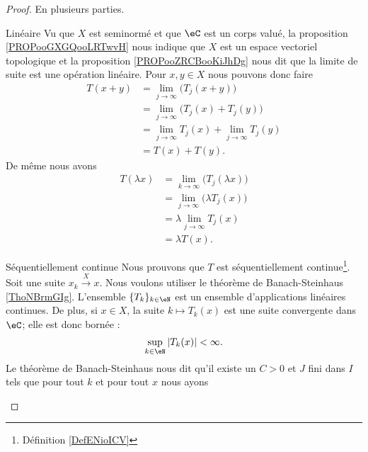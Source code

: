\begin{proof}
    En plusieurs parties.
    \begin{subproof}
    \item[Linéaire]
        Vu que \( X\) est seminormé et que \( \eC\) est un corps valué, la proposition \ref{PROPooGXGQooLRTwvH} nous indique que \( X\) est un espace vectoriel topologique et la proposition \ref{PROPooZRCBooKiJhDg} nous dit que la limite de suite est une opération linéaire. Pour \( x,y\in X\) nous pouvons donc faire
        \begin{subequations}
            \begin{align}
                T(x+y)&=\lim_{j\to \infty} \big( T_j(x+y) \big)\\
                &=\lim_{j\to \infty} \big( T_j(x)+T_j(y) \big)\\
                &=\lim_{j\to \infty} T_j(x)+\lim_{j\to \infty} T_j(y)\\
                &=T(x)+T(y).
            \end{align}
        \end{subequations}
        De même nous avons
        \begin{subequations}
            \begin{align}
                T(\lambda x)&=\lim_{k\to \infty} \big( T_j(\lambda x) \big)\\
                &=\lim_{j\to \infty} \big( \lambda T_j(x) \big)\\
                &=\lambda\lim_{j\to \infty} T_j(x)\\
                &=\lambda T(x).
            \end{align}
        \end{subequations}
    \item[Séquentiellement continue]
        Nous prouvons que \( T\) est séquentiellement continue\footnote{Définition \ref{DefENioICV}}. Soit une suite \( x_k\stackrel{X}{\longrightarrow}x\). Nous voulons utiliser le théorème de Banach-Steinhaus \ref{ThoNBrmGIg}. L'ensemble \( \{ T_k \}_{k\in \eN}\) est un ensemble d'applications linéaires continues. De plus, si \( x\in X\), la suite \( k\mapsto T_k(x)\) est une suite convergente dans \( \eC\); elle est donc bornée :
        \begin{equation}
            \sup_{k\in \eN}| T_k(x) |<\infty.
        \end{equation}
        Le théorème de Banach-Steinhaus nous dit qu'il existe un \( C>0\) et \( J\) fini dans \( I\) tels que pour tout \( k\) et pour tout \( x\) nous ayons

\end{subproof}
\end{proof}
